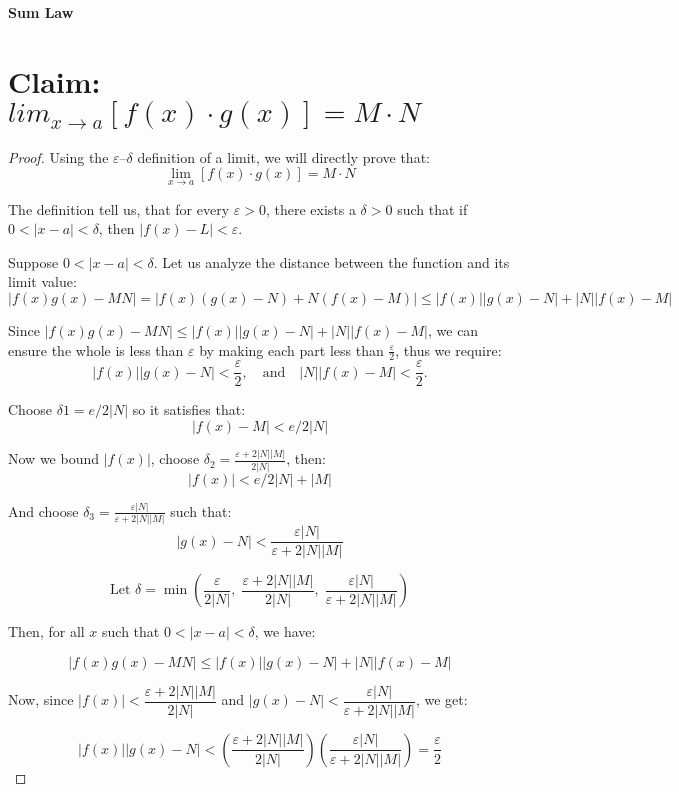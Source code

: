 \documentclass{article}
\begin{document}
	
\textbf{Sum Law}

\section*{Claim: $lim_{x \to a} [f(x) \cdot g(x)] = M \cdot N$}


\begin{proof}

Using the $\varepsilon$–$\delta$ definition of a limit, we will directly prove that:
\[
\lim_{x \to a} [f(x) \cdot g(x)] = M \cdot N
\]

The definition tell us, that for every $\varepsilon > 0$, there exists a $\delta > 0$ such that if $0 < |x - a| < \delta$, then $|f(x) - L| < \varepsilon$.

Suppose $0 < |x - a| < \delta$. Let us analyze the distance between the function and its limit value:
\[
|f(x)g(x) - MN| = \left| f(x)(g(x) - N) + N(f(x) - M) \right| \leq |f(x)||g(x) - N| + |N||f(x) - M|
\]


Since $|f(x)g(x) - MN| \leq |f(x)||g(x) - N| + |N||f(x) - M|$, we can ensure the whole is less than $\varepsilon$ by making each part less than $\frac{\varepsilon}{2}$, thus we require:
\[
|f(x)||g(x) - N| < \frac{\varepsilon}{2}, \quad \text{and} \quad |N||f(x) - M| < \frac{\varepsilon}{2}.
\]

Choose $\delta1 = e/2|N|$ so it satisfies that:
\[
|f(x) - M| < e/2|N|
\]

Now we bound $|f(x)|$, choose $\delta_2 = \frac{\varepsilon + 2|N||M|}{2|N|}$, then:
\[
|f(x)| < e/2|N| + |M|
\]

And choose $\delta_3 = \frac{\varepsilon |N|}{\varepsilon + 2|N||M|}$ such that:
\[
|g(x) - N| < \frac{\varepsilon |N|}{\varepsilon + 2|N||M|}
\]

\[
\text{Let } \delta = \min\left( \frac{\varepsilon}{2|N|}, \; \frac{\varepsilon + 2|N||M|}{2|N|}, \; \frac{\varepsilon |N|}{\varepsilon + 2|N||M|} \right)
\]

Then, for all \( x \) such that \( 0 < |x - a| < \delta \), we have:

\[
|f(x)g(x) - MN| 
\leq |f(x)||g(x) - N| + |N||f(x) - M|
\]

Now, since \( |f(x)| < \dfrac{\varepsilon + 2|N||M|}{2|N|} \) and \( |g(x) - N| < \dfrac{\varepsilon |N|}{\varepsilon + 2|N||M|} \), we get:

\[
|f(x)||g(x) - N| 
< \left( \frac{\varepsilon + 2|N||M|}{2|N|} \right)
\left( \frac{\varepsilon |N|}{\varepsilon + 2|N||M|} \right) 
= \frac{\varepsilon}{2}
\]


\end{proof}
\end{document}
